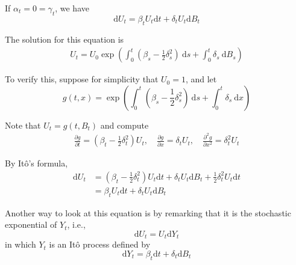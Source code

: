 \begin{example}
    If $\alpha_t = 0 = \gamma_t$, we have
    \begin{equation*}
        \mathrm{d}U_t = \beta_t U_t \mathrm{d}t + \delta_t U_t \mathrm{d}B_t
    \end{equation*}

    The solution for this equation is 
    \begin{equation*}
        \begin{aligned}
            U_t = U_0 \exp \left( \int_0^t \left( \beta_s - \frac{1}{2} \delta_s^2 \right)~\mathrm{d}s + \int_0^t \delta_s~\mathrm{d}B_s \right)
        \end{aligned}
    \end{equation*}

    To verify this, suppose for simplicity that $U_0 = 1$, and let
    \begin{equation*}
        g(t,x) = \exp \left( \int_0^t \left( \beta_s - \frac{1}{2} \delta_s^2 \right)~\mathrm{d}s + \int_0^t \delta_s~\mathrm{d}x \right)
    \end{equation*}

    Note that $U_t = g(t,B_t)$ and compute 
    \begin{equation*}
        \begin{aligned}
            \frac{\partial g}{\partial t} = \left( \beta_t - \frac{1}{2} \delta_t^2 \right) U_t, \quad 
            \frac{\partial g}{\partial x} = \delta_t  U_t, \quad \frac{\partial^2 g}{\partial x^2} = \delta_t^2 U_t
        \end{aligned}
    \end{equation*}

    By Itô's formula, 
    \begin{equation*}
        \begin{aligned}
            \mathrm{d}U_t &= \left( \beta_t - \frac{1}{2} \delta_t^2 \right) U_t \mathrm{d}t + \delta_t U_t \mathrm{d}B_t + \frac{1}{2} \delta_t^2 U_t \mathrm{d}t \\ 
            &= \beta_t U_t \mathrm{d}t + \delta_t U_t \mathrm{d}B_t
        \end{aligned}
    \end{equation*}

    Another way to look at this equation is by remarking that it is the stochastic exponential of $Y_t$, i.e.,
    \begin{equation}
        \mathrm{d}U_t = U_t \mathrm{d}Y_t
    \end{equation}
    in which $Y_t$ is an Itô process defined by
    \[
        \mathrm{d}Y_t = \beta_t \mathrm{d}t + \delta_t \mathrm{d}B_t
    \]


\end{example}
